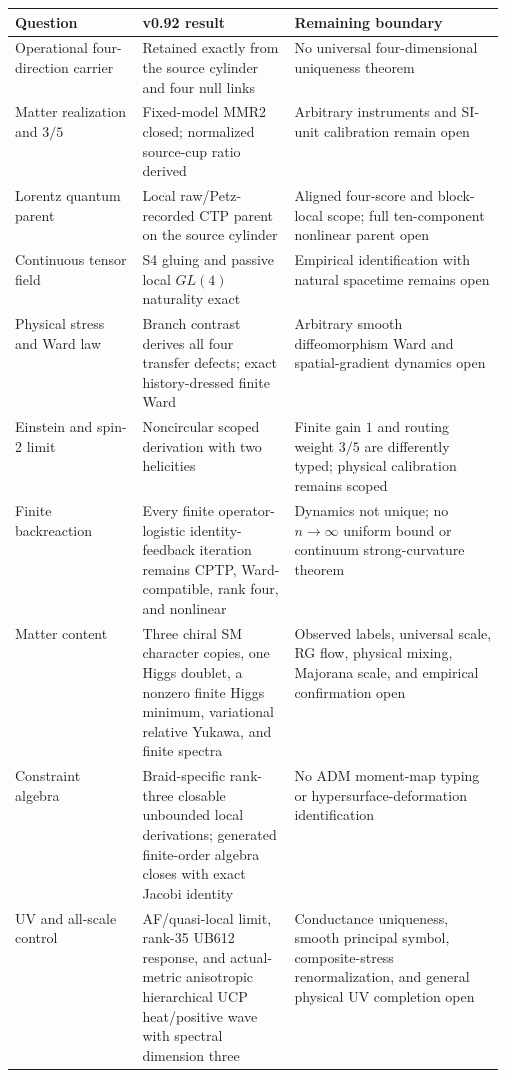 \documentclass[11pt]{article}
\theoremstyle{definition}
\theoremstyle{remark}
\begin{document}
\begin{table}[ht]
\centering
\scriptsize
\begin{tabularx}{\linewidth}{>{\raggedright\arraybackslash}p{0.26\linewidth} >{\raggedright\arraybackslash}p{0.31\linewidth} X}
\toprule
Question & v0.92 result & Remaining boundary \\
\midrule
Operational four-direction carrier & Retained exactly from the source cylinder and four null links & No universal four-dimensional uniqueness theorem \\
Matter realization and $3/5$ & Fixed-model MMR2 closed; normalized source-cup ratio derived & Arbitrary instruments and SI-unit calibration remain open \\
Lorentz quantum parent & Local raw/Petz-recorded CTP parent on the source cylinder & Aligned four-score and block-local scope; full ten-component nonlinear parent open \\
Continuous tensor field & S4 gluing and passive local $GL(4)$ naturality exact & Empirical identification with natural spacetime remains open \\
Physical stress and Ward law & Branch contrast derives all four transfer defects; exact history-dressed finite Ward & Arbitrary smooth diffeomorphism Ward and spatial-gradient dynamics open \\
Einstein and spin-2 limit & Noncircular scoped derivation with two helicities & Finite gain $1$ and routing weight $3/5$ are differently typed; physical calibration remains scoped \\
Finite backreaction & Every finite operator-logistic identity-feedback iteration remains CPTP, Ward-compatible, rank four, and nonlinear & Dynamics not unique; no $n\to\infty$ uniform bound or continuum strong-curvature theorem \\
Matter content & Three chiral SM character copies, one Higgs doublet, a nonzero finite Higgs minimum, variational relative Yukawa, and finite spectra & Observed labels, universal scale, RG flow, physical mixing, Majorana scale, and empirical confirmation open \\
Constraint algebra & Braid-specific rank-three closable unbounded local derivations; generated finite-order algebra closes with exact Jacobi identity & No ADM moment-map typing or hypersurface-deformation identification \\
UV and all-scale control & AF/quasi-local limit, rank-35 UB612 response, and actual-metric anisotropic hierarchical UCP heat/positive wave with spectral dimension three & Conductance uniqueness, smooth principal symbol, composite-stress renormalization, and general physical UV completion open \\

\end{tabularx}
\end{table}
\end{document}
